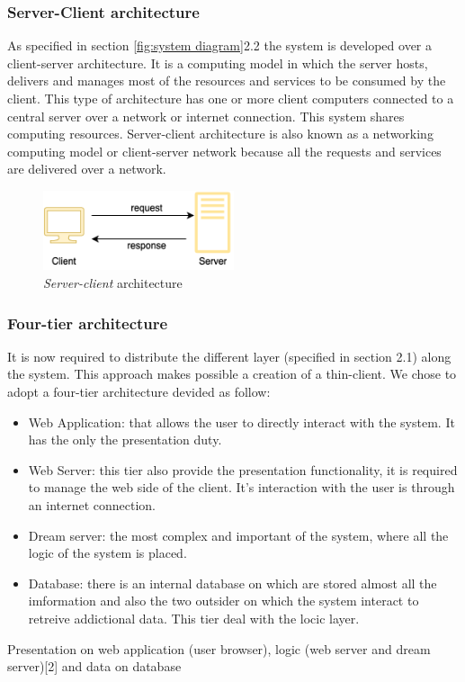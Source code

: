 \subsubsection{Server-Client architecture}
As specified in section \ref{fig:system diagram}{2.2} the system is developed over a client-server architecture. It is a computing model in which the server hosts, delivers and manages most of the resources and services to be consumed by the client. This type of architecture has one or more client computers connected to a central server over a network or internet connection. This system shares computing resources. Server-client architecture is also known as a networking computing model or client-server network because all the requests and services are delivered over a network.
\begin{figure}[H]
    \begin{center}
    \includegraphics[width=0.5\textwidth]{images/client-server.png}
    \caption{\emph{Server-client} architecture}
    \label{fig:client-server}
    \end{center}
\end{figure}

\subsubsection{Four-tier architecture}
It is now required to distribute the different layer (specified in section 2.1) along the system. This approach makes possible a creation of a thin-client. We chose to adopt a four-tier architecture devided as follow:
\begin{itemize}
    \item Web Application: that allows the user to directly interact with the system. It has the only the presentation duty.
    \item Web Server: this tier also provide the presentation functionality, it is required to manage the web side of the client. It's interaction with the user is through an internet connection.
    \item Dream server: the most complex and important of the system, where all the logic of the system is placed.
    \item Database: there is an internal database on which are stored almost all the imformation and also the two outsider on which the system interact to retreive addictional data. This tier deal with the locic layer.
\end{itemize}
Presentation on web application (user browser), logic (web server and dream server)[2] and data on database 

